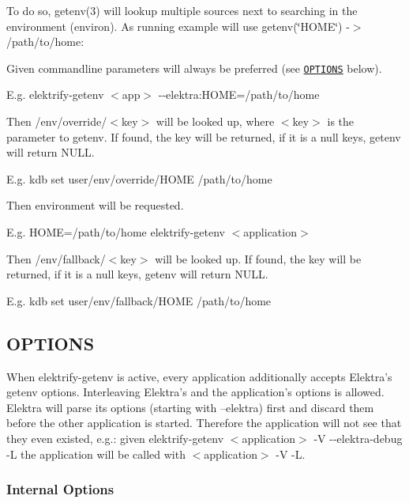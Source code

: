 To do so, getenv(3) will lookup multiple sources next to searching in the environment (environ). As running example will use {\ttfamily getenv(\char`\"{}\+H\+O\+M\+E\char`\"{}) -\/$>$ /path/to/home}\+:


\begin{DoxyEnumerate}
\item Given commandline parameters will always be preferred (see \href{#OPTIONS}{\tt O\+P\+T\+I\+O\+N\+S} below).

E.\+g. {\ttfamily elektrify-\/getenv $<$app$>$ -\/-\/elektra\+:H\+O\+M\+E=/path/to/home}
\item Then {\ttfamily /env/override/$<$key$>$} will be looked up, where $<$key$>$ is the parameter to {\ttfamily getenv}. If found, the key will be returned, if it is a null keys, {\ttfamily getenv} will return {\ttfamily N\+U\+L\+L}.

E.\+g. {\ttfamily kdb set user/env/override/\+H\+O\+M\+E /path/to/home}
\item Then environment will be requested.

E.\+g. {\ttfamily H\+O\+M\+E=/path/to/home elektrify-\/getenv $<$application$>$}
\item Then {\ttfamily /env/fallback/$<$key$>$} will be looked up. If found, the key will be returned, if it is a null keys, {\ttfamily getenv} will return {\ttfamily N\+U\+L\+L}.

E.\+g. {\ttfamily kdb set user/env/fallback/\+H\+O\+M\+E /path/to/home}
\end{DoxyEnumerate}

\subsection*{O\+P\+T\+I\+O\+N\+S}

When {\ttfamily elektrify-\/getenv} is active, every application additionally accepts Elektra's getenv options. Interleaving Elektra's and the application's options is allowed. Elektra will parse its options (starting with --elektra) first and discard them before the other application is started. Therefore the application will not see that they even existed, e.\+g.\+: given {\ttfamily elektrify-\/getenv $<$application$>$ -\/\+V -\/-\/elektra-\/debug -\/\+L} the application will be called with {\ttfamily $<$application$>$ -\/\+V -\/\+L}.

\subsubsection*{Internal Options}


